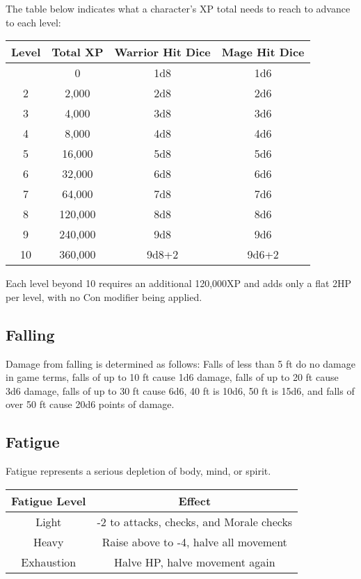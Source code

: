 \documentclass{article}
\begin{document}
\begin{multicols}{2}
The table below indicates what a character's XP total needs to reach to
advance to each level:

\begin{longtable}[]{@{}cccc@{}}
\toprule\noalign{}
Level & Total XP & Warrior Hit Dice & Mage Hit Dice \\
\midrule\noalign{}
\endhead
\bottomrule\noalign{}
\endlastfoot
1 & 0 & 1d8 & 1d6 \\
2 & 2,000 & 2d8 & 2d6 \\
3 & 4,000 & 3d8 & 3d6 \\
4 & 8,000 & 4d8 & 4d6 \\
5 & 16,000 & 5d8 & 5d6 \\
6 & 32,000 & 6d8 & 6d6 \\
7 & 64,000 & 7d8 & 7d6 \\
8 & 120,000 & 8d8 & 8d6 \\
9 & 240,000 & 9d8 & 9d6 \\
10 & 360,000 & 9d8+2 & 9d6+2 \\
\end{longtable}

Each level beyond 10 requires an additional 120,000XP and adds only a
flat 2HP per level, with no Con modifier being applied.

\subsection{Falling}\label{falling}

Damage from falling is determined as follows: Falls of less than 5 ft do
no damage in game terms, falls of up to 10 ft cause 1d6 damage, falls of
up to 20 ft cause 3d6 damage, falls of up to 30 ft cause 6d6, 40 ft is
10d6, 50 ft is 15d6, and falls of over 50 ft cause 20d6 points of
damage.

\subsection{Fatigue}\label{fatigue}

Fatigue represents a serious depletion of body, mind, or spirit.

\begin{longtable}[]{@{}cc@{}}
\toprule\noalign{}
Fatigue Level & Effect \\
\midrule\noalign{}
\endhead
\bottomrule\noalign{}
\endlastfoot
Light & -2 to attacks, checks, and Morale checks \\
Heavy & Raise above to -4, halve all movement \\
Exhaustion & Halve HP, halve movement again \\
\end{longtable}


\end{multicols}
\end{document}
